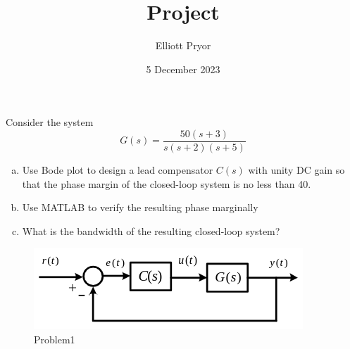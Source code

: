 \documentclass[11pt]{article}
\title{Project}
\author{Elliott Pryor}
\date{5 December 2023}
\begin{document}
\maketitle

Consider the system
$$
G(s) = \frac{50(s+3)}{s(s+2)(s+5)}
$$

\begin{enumerate}[a)]
    \item Use Bode plot to design a lead compensator $C(s)$ with unity DC gain so that the phase margin of the closed-loop system is no less than 40\degree.
    \item Use MATLAB to verify the resulting phase marginally
    \item What is the bandwidth of the resulting closed-loop system?
\end{enumerate}

\begin{figure}[h] 
    \centering
    \includegraphics[width=0.55 \linewidth]{12-04-p1.png}
    \caption{Problem1}
    \label{fig:p1}
\end{figure}

\soln
\end{document}
